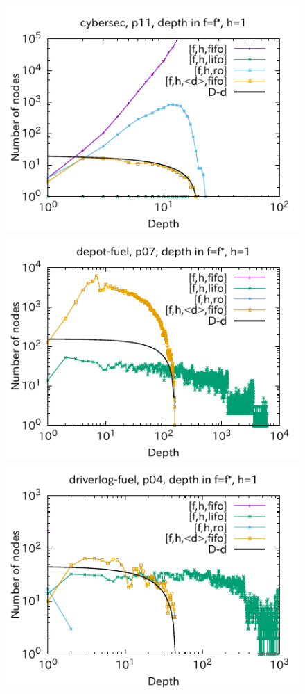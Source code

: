 \begin{figure}[htbp]
\includegraphics{img/output-lmcut1/cybersec/p11.pdf}
\includegraphics{img/output-lmcut1/depot-fuel/p07.pdf}
\includegraphics{img/output-lmcut1/driverlog-fuel/p04.pdf}

\end{figure}
